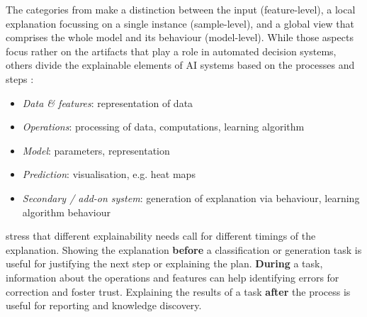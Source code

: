 The categories from \cite{biran2017explanation} make a distinction between the input (feature-level), a local explanation focussing on a single instance (sample-level), and a global view that comprises the whole model and its behaviour (model-level). While those aspects focus rather on the artifacts that play a role in automated decision systems, others divide the explainable elements of AI systems based on the processes and steps \cite{bibal2016interpretability, gilpin2018explaining, miller2017explanation, preece2018asking, richardson2018survey, ventocilla2018taxonomy}:
\begin{itemize}
	\item \textit{Data \& features}: representation of data 
	\item \textit{Operations}: processing of data, computations, learning algorithm
	\item \textit{Model}: parameters, representation
	\item \textit{Prediction}: visualisation, e.g. heat maps
	\item \textit{Secondary / add-on system}: generation of explanation via behaviour, learning algorithm behaviour
\end{itemize}
\cite{richardson2018survey} stress that different explainability needs call for different timings of the explanation. Showing the explanation \textbf{before} a classification or generation task is useful for justifying the next step or explaining the plan. \textbf{During} a task, information about the operations and features can help identifying errors for correction and foster trust. Explaining the results of a task \textbf{after} the process is useful for reporting and knowledge discovery.\newline




